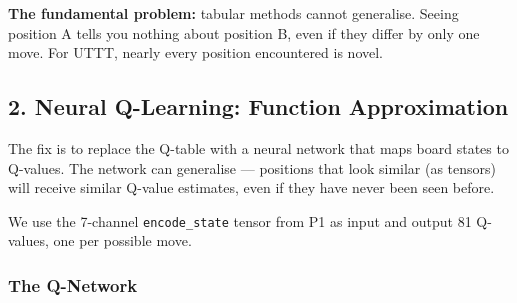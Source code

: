 \textbf{The fundamental problem:} tabular methods cannot generalise.
Seeing position A tells you nothing about position B, even if they
differ by only one move. For UTTT, nearly every position encountered is
novel.

\hypertarget{neural-q-learning-function-approximation}{%
\subsection{2. Neural Q-Learning: Function
Approximation}\label{neural-q-learning-function-approximation}}

The fix is to replace the Q-table with a neural network that maps board
states to Q-values. The network can generalise --- positions that look
similar (as tensors) will receive similar Q-value estimates, even if
they have never been seen before.

We use the 7-channel \texttt{encode\_state} tensor from P1 as input and
output 81 Q-values, one per possible move.

\hypertarget{the-q-network}{%
\subsubsection{The Q-Network}\label{the-q-network}}

